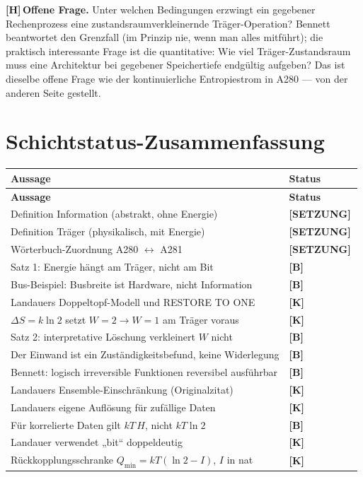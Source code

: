 \documentclass[11pt,a4paper]{article}
\newcommand{\LS}{\textcolor{laySet}{\textbf{\footnotesize\textsf{[SETZUNG]}}}\,}
\newcommand{\LK}{\textcolor{layK}{\textbf{\footnotesize\textsf{[K]}}}\,}
\newcommand{\LB}{\textcolor{layB}{\textbf{\footnotesize\textsf{[B]}}}\,}
\newcommand{\LH}{\textcolor{layH}{\textbf{\footnotesize\textsf{[H]}}}\,}
\theoremstyle{ffgft}
\begin{document}
\LH \textbf{Offene Frage.} Unter welchen Bedingungen erzwingt ein gegebener
Rechenprozess eine zustandsraumverkleinernde Träger-Operation? Bennett beantwortet
den Grenzfall (im Prinzip nie, wenn man alles mitführt); die praktisch
interessante Frage ist die quantitative: Wie viel Träger-Zustandsraum muss eine
Architektur bei gegebener Speichertiefe endgültig aufgeben? Das ist dieselbe
offene Frage wie der kontinuierliche Entropiestrom in A280 --- von der anderen
Seite gestellt.

\section{Schichtstatus-Zusammenfassung}

\begin{center}
\small
\begin{longtable}{@{}p{}l@{}}
\toprule
\textbf{Aussage} & \textbf{Status} \\
\midrule
\endfirsthead
\toprule
\textbf{Aussage} & \textbf{Status} \\
\midrule
\endhead
Definition Information (abstrakt, ohne Energie) & \LS \\
Definition Träger (physikalisch, mit Energie) & \LS \\
Wörterbuch-Zuordnung A280 $\leftrightarrow$ A281 & \LS \\
Satz 1: Energie hängt am Träger, nicht am Bit & \LB \\
Bus-Beispiel: Busbreite ist Hardware, nicht Information & \LB \\
Landauers Doppeltopf-Modell und \textup{RESTORE TO ONE} & \LK \\
$\Delta S = k\ln 2$ setzt $W{=}2 \to W{=}1$ am Träger voraus & \LK \\
Satz 2: interpretative Löschung verkleinert $W$ nicht & \LB \\
Der Einwand ist ein Zuständigkeitsbefund, keine Widerlegung & \LB \\
Bennett: logisch irreversible Funktionen reversibel ausführbar & \LB \\
Landauers Ensemble-Einschränkung (Originalzitat) & \LK \\
Landauers eigene Auflösung für zufällige Daten & \LK \\
Für korrelierte Daten gilt $kT\,H$, nicht $kT\ln 2$ & \LB \\
Landauer verwendet „bit“ doppeldeutig & \LK \\
Rückkopplungsschranke $Q_{\min} = kT(\ln 2 - I)$, $I$ in nat & \LK \\

\end{longtable}
\end{center}
\end{document}

